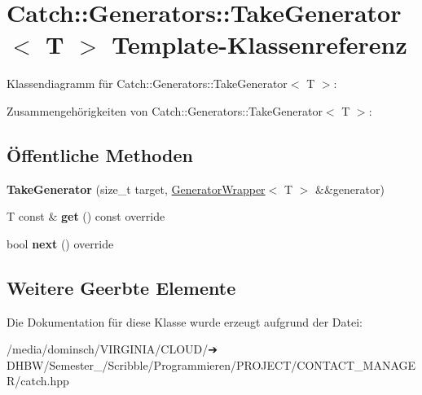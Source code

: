 \hypertarget{classCatch_1_1Generators_1_1TakeGenerator}{}\section{Catch\+:\+:Generators\+:\+:Take\+Generator$<$ T $>$ Template-\/\+Klassenreferenz}
\label{classCatch_1_1Generators_1_1TakeGenerator}


Klassendiagramm für Catch\+:\+:Generators\+:\+:Take\+Generator$<$ T $>$\+:


Zusammengehörigkeiten von Catch\+:\+:Generators\+:\+:Take\+Generator$<$ T $>$\+:
\subsection*{Öffentliche Methoden}
\begin{DoxyCompactItemize}
\item 
\mbox{\label{classCatch_1_1Generators_1_1TakeGenerator_aacef789c01a86246249c88a184268c65}} 
{\bfseries Take\+Generator} (size\+\_\+t target, \hyperlink{classCatch_1_1Generators_1_1GeneratorWrapper}{Generator\+Wrapper}$<$ T $>$ \&\&generator)
\item 
\mbox{\label{classCatch_1_1Generators_1_1TakeGenerator_aa4d2560f2066ec2eb4a351d62c107c78}} 
T const  \& {\bfseries get} () const override
\item 
\mbox{\label{classCatch_1_1Generators_1_1TakeGenerator_ae343f3e28fe04e0a20d6fdf69bfb4c78}} 
bool {\bfseries next} () override
\end{DoxyCompactItemize}
\subsection*{Weitere Geerbte Elemente}


Die Dokumentation für diese Klasse wurde erzeugt aufgrund der Datei\+:\begin{DoxyCompactItemize}
\item 
/media/dominsch/\+V\+I\+R\+G\+I\+N\+I\+A/\+C\+L\+O\+U\+D/➔ D\+H\+B\+W/\+Semester\+\_/\+Scribble/\+Programmieren/\+P\+R\+O\+J\+E\+C\+T/\+C\+O\+N\+T\+A\+C\+T\+\_\+\+M\+A\+N\+A\+G\+E\+R/catch.\+hpp\end{DoxyCompactItemize}
